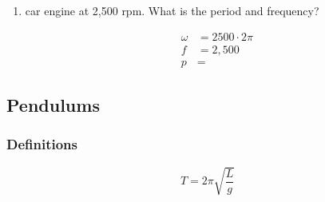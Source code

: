 \documentclass{exam}
\begin{document}
\begin{enumerate}
    \item car engine at 2,500 rpm.  What is the period and frequency?
      \begin{solution}
        \begin{align*}
          \omega &= 2500 \cdot 2 \pi \\
          f &= 2,500 \\
          p &= 
        \end{align*}
      \end{solution}
  \end{enumerate}

  \subsection{Pendulums}

  \subsubsection{Definitions}
  \[
    T = 2 \pi \sqrt{\frac{L}{g}}
  \]
\end{document}
